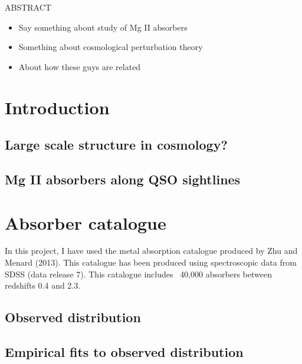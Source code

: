 \documentclass[12pt,a4paper,twoside]{book}
\begin{document}

\newpage\topskip 40pt
\thispagestyle{empty}
\centerline{\Large ABSTRACT}
\vskip 20pt\noindent 
\begin{itemize}
	\item Say something about study of Mg II absorbers
	\item Something about cosmological perturbation theory
	\item About how these guys are related
\end{itemize}


\newpage
\thispagestyle{empty}
\tableofcontents
\newpage




\chapter{Introduction}
	\section{Large scale structure in cosmology?}
	\section{Mg II absorbers along QSO sightlines}
\chapter{Absorber catalogue}
	In this project, I have used the metal absorption catalogue produced by Zhu and Menard (2013). This catalogue has been produced using spectroscopic data from SDSS (data release 7). This catalogue includes ~40,000 absorbers between redshifts 0.4 and 2.3.
	\section{Observed distribution}
	\section{Empirical fits to observed distribution}
\end{document}
